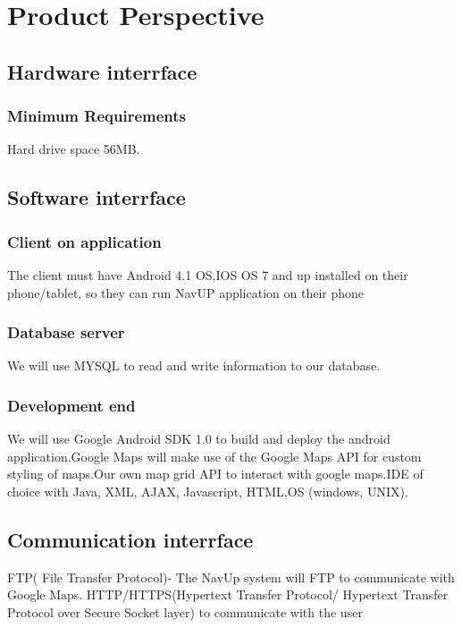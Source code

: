 \documentclass[11pt]{article}
\begin{document}
\clearpage
	
	\section{Product Perspective}
	 
		\subsection{Hardware interrface}
			\subsubsection{Minimum Requirements}
Hard drive space 56MB.
		
		\subsection{Software interrface}
			\subsubsection{Client on application}
The client must have Android 4.1 OS,IOS OS 7 and up installed on their phone/tablet, so they can run  NavUP application on their phone

			\subsubsection{Database server}	
We will use MYSQL to read and write information to our database.

			\subsubsection{Development end}
We will use Google Android SDK 1.0 to build and deploy the android application.Google Maps will make use of the Google Maps API for custom styling of maps.Our own map grid API to interact with google maps.IDE of choice with Java, XML, AJAX, Javascript, HTML,OS (windows, UNIX).
		\subsection{Communication interrface}
FTP( File Transfer Protocol)- The NavUp system will FTP to communicate with Google Maps.
HTTP/HTTPS(Hypertext Transfer Protocol/ Hypertext Transfer Protocol over Secure Socket layer) to communicate with the user

	
	
\end{document}
